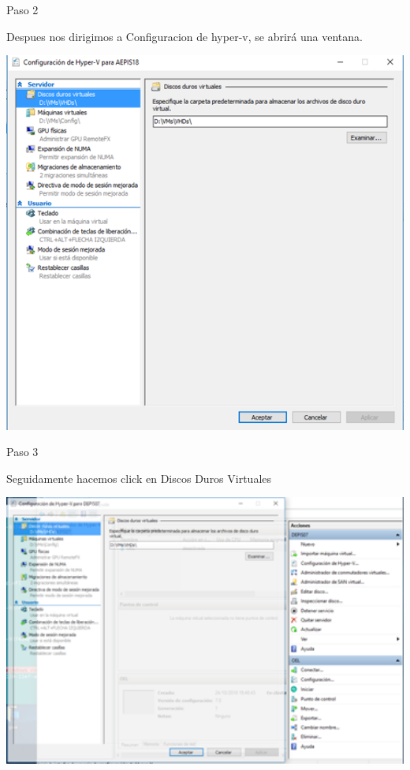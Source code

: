 	\begin{itemize}
	\begin{center}
	    Paso 2
	\end{center}
	

	    Despues nos dirigimos a Configuracion de hyper-v, se abrirá una ventana. 
		\begin{center}
		\includegraphics[width=15cm]{./Imagenes/imagen2} 
		\end{center}
	

	\end{itemize} 
	
	
	\begin{itemize}
	\begin{center}
  	  Paso 3
	\end{center}


   	 Seguidamente hacemos click en Discos Duros Virtuales\\
	\begin{center}
	\includegraphics[width=15cm]{./Imagenes/imagen3} 
	\end{center}


	\end{itemize} 



